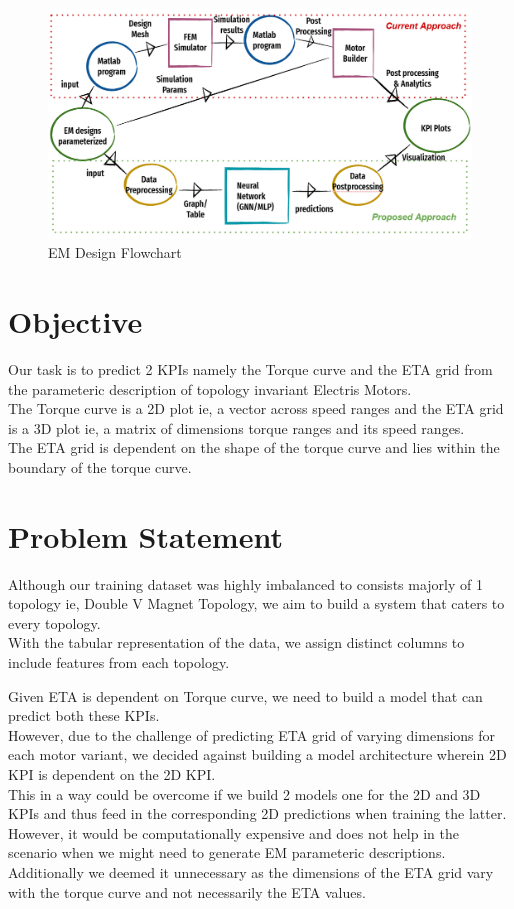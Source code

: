 \documentclass{report} %
\begin{document}
\begin{figure}[H]
    \centering
    \includegraphics[width=1\textwidth]{./ReportImages/EM_design_flowchart_v2.png} 
    \caption{EM Design Flowchart}
    \label{fig:EM Design Flowchart}
\end{figure}


\section{Objective}\label{sec:Objective}
Our task is to predict 2 KPIs namely the Torque curve and the ETA grid from the parameteric description of topology invariant Electris Motors. \\
The Torque curve is a 2D plot ie, a vector across speed ranges and the ETA grid is a 3D plot ie, a matrix of dimensions torque ranges and its speed ranges. \\
The ETA grid is dependent on the shape of the torque curve and lies within the boundary of the torque curve.\\

\section{Problem Statement}\label{sec:Problem Statement}

Although our training dataset was highly imbalanced to consists majorly of 1 topology ie, Double V Magnet Topology, we aim to build a system that caters to every topology. \\
With the tabular representation of the data, we assign distinct columns to include features from each topology.

Given ETA is dependent on Torque curve, we need to build a model that can predict both these KPIs.\\
However, due to the challenge of predicting ETA grid of varying dimensions for each motor variant, we decided against building a model architecture wherein 2D KPI is dependent on the 2D KPI. \\
This in a way could be overcome if we build 2 models one for the 2D and 3D KPIs and thus feed in the corresponding 2D predictions when training the latter. \\
However, it would be computationally expensive and does not help in the scenario when we might need to generate \ac{EM} parameteric descriptions.
Additionally we deemed it unnecessary as the dimensions of the ETA grid vary with the torque curve and not necessarily the ETA values. \\
\end{document}
